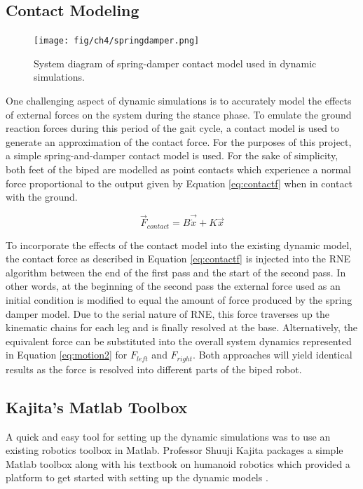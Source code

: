 
\subsection{Contact Modeling} %
\label{sec:contact_modelling}

\begin{figure}[!ht]
	\begin{center}
    \texttt{[image: fig/ch4/springdamper.png]}
	\end{center}
  \caption{System diagram of spring-damper contact model used in dynamic simulations.}
\end{figure}

One challenging aspect of dynamic simulations is to accurately model the effects of external forces on the system during the stance phase. To emulate the ground reaction forces during this period of the gait cycle, a contact model is used to generate an approximation of the contact force. For the purposes of this project, a simple spring-and-damper contact model is used. For the sake of simplicity, both feet of the biped are modelled as point contacts which experience a normal force proportional to the output given by Equation \ref{eq:contactf} when in contact with the ground. 

\begin{equation}
	\label{eq:contactf}
	\vec{F}_{contact} = B\vec{\dot{x}} + K\vec{x}
\end{equation}


To incorporate the effects of the contact model into the existing dynamic model, the contact force as described in Equation \ref{eq:contactf} is injected into the RNE algorithm between the end of the first pass and the start of the second pass. In other words, at the beginning of the second pass the external force used as an initial condition is modified to equal the amount of force produced by the spring damper model. Due to the serial nature of RNE, this force traverses up the kinematic chains for each leg and is finally resolved at the base. Alternatively, the equivalent force can be substituted into the overall system dynamics represented in Equation \ref{eq:motion2} for $F_{left}$ and $F_{right}$. Both approaches will yield identical results as the force is resolved into different parts of the biped robot. 


\subsection{Kajita's Matlab Toolbox} %
\label{sec:kajita_s_matlab_toolbox}
A quick and easy tool for setting up the dynamic simulations was to use an existing robotics toolbox in Matlab. Professor Shuuji Kajita packages a simple Matlab toolbox along with his textbook on humanoid robotics which provided a platform to get started with setting up the dynamic models \cite{kajitatxt}. 

